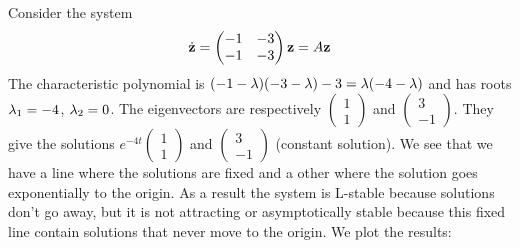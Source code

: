 \begin{exemple}
Consider the system
$$ \dot{\mathbf{z}}=
\begin{pmatrix} -1&-3\\-1&-3 \end{pmatrix}\mathbf{z} =A\mathbf{z}
$$
The characteristic polynomial is $(-1-\lambda)(-3-\lambda)-3=\lambda(-4-\lambda)$ and has roots $\lambda_1=-4$, $\lambda_2=0$. The eigenvectors are respectively $\begin{pmatrix}1\\1\end{pmatrix}$ and 
$\begin{pmatrix}3\\-1\end{pmatrix}$. They give the solutions $e^{-4t}\begin{pmatrix}1\\1\end{pmatrix}$ and $\begin{pmatrix}3\\-1\end{pmatrix}$ (constant solution). 
We see that we have a line where the solutions are fixed and a other where the solution goes exponentially to the origin. As a result the system is L-stable because solutions don't go away, but it is not attracting or asymptotically stable because this fixed line contain solutions that never move to the origin.
We plot the results: 
\end{exemple}

